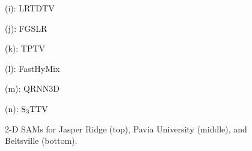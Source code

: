 \begin{figure}[t]
\begin{center}
		\vspace{1mm}
		
		\begin{minipage}{0.15\hsize}
			\centerline{\small{(i): LRTDTV}}
		\end{minipage}
		\begin{minipage}{0.15\hsize}
			\centerline{\small{(j): FGSLR}}
		\end{minipage}
		\begin{minipage}{0.15\hsize}
			\centerline{\small{(k): TPTV}}
		\end{minipage}
		\begin{minipage}{0.15\hsize}
			\centerline{\small{(l): FastHyMix}}
		\end{minipage}
		\begin{minipage}{0.15\hsize}
			\centerline{\small{(m): QRNN3D}}
		\end{minipage}
		\begin{minipage}{0.15\hsize}
			\centerline{\small{(n): ${\text{S}_{3} \text{TTV}}$}}
		\end{minipage}
		\begin{minipage}{0.050\hsize}
			\centerline{\hspace{\hsize}} %
		\end{minipage}
		
	\end{center}
	
	\vspace{-3mm}
	\caption{2-D SAMs for Jasper Ridge (top), Pavia University (middle), and Beltsville (bottom).}
	
	\label{fig:2D_SAM}
\end{figure}